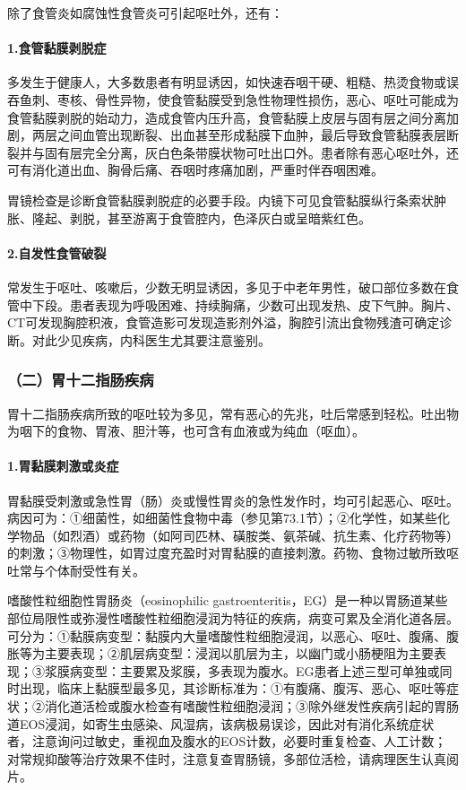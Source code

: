 除了食管炎如腐蚀性食管炎可引起呕吐外，还有：

\paragraph{1.食管黏膜剥脱症}

多发生于健康人，大多数患者有明显诱因，如快速吞咽干硬、粗糙、热烫食物或误吞鱼刺、枣核、骨性异物，使食管黏膜受到急性物理性损伤，恶心、呕吐可能成为食管黏膜剥脱的始动力，造成食管内压升高，食管黏膜上皮层与固有层之间分离加剧，两层之间血管出现断裂、出血甚至形成黏膜下血肿，最后导致食管黏膜表层断裂并与固有层完全分离，灰白色条带膜状物可吐出口外。患者除有恶心呕吐外，还可有消化道出血、胸骨后痛、吞咽时疼痛加剧，严重时伴吞咽困难。

胃镜检查是诊断食管黏膜剥脱症的必要手段。内镜下可见食管黏膜纵行条索状肿胀、隆起、剥脱，甚至游离于食管腔内，色泽灰白或呈暗紫红色。

\paragraph{2.自发性食管破裂}

常发生于呕吐、咳嗽后，少数无明显诱因，多见于中老年男性，破口部位多数在食管中下段。患者表现为呼吸困难、持续胸痛，少数可出现发热、皮下气肿。胸片、CT可发现胸腔积液，食管造影可发现造影剂外溢，胸腔引流出食物残渣可确定诊断。对此少见疾病，内科医生尤其要注意鉴别。

\subsubsection{（二）胃十二指肠疾病}

胃十二指肠疾病所致的呕吐较为多见，常有恶心的先兆，吐后常感到轻松。吐出物为咽下的食物、胃液、胆汁等，也可含有血液或为纯血（呕血）。

\paragraph{1.胃黏膜刺激或炎症}

胃黏膜受刺激或急性胃（肠）炎或慢性胃炎的急性发作时，均可引起恶心、呕吐。病因可为：①细菌性，如细菌性食物中毒（参见第73.1节）；②化学性，如某些化学物品（如烈酒）或药物（如阿司匹林、磺胺类、氨茶碱、抗生素、化疗药物等）的刺激；③物理性，如胃过度充盈时对胃黏膜的直接刺激。药物、食物过敏所致呕吐常与个体耐受性有关。

嗜酸性粒细胞性胃肠炎（eosinophilic
gastroenteritis，EG）是一种以胃肠道某些部位局限性或弥漫性嗜酸性粒细胞浸润为特征的疾病，病变可累及全消化道各层。可分为：①黏膜病变型：黏膜内大量嗜酸性粒细胞浸润，以恶心、呕吐、腹痛、腹胀等为主要表现；②肌层病变型：浸润以肌层为主，以幽门或小肠梗阻为主要表现；③浆膜病变型：主要累及浆膜，多表现为腹水。EG患者上述三型可单独或同时出现，临床上黏膜型最多见，其诊断标准为：①有腹痛、腹泻、恶心、呕吐等症状；②消化道活检或腹水检查有嗜酸性粒细胞浸润；③除外继发性疾病引起的胃肠道EOS浸润，如寄生虫感染、风湿病，该病极易误诊，因此对有消化系统症状者，注意询问过敏史，重视血及腹水的EOS计数，必要时重复检查、人工计数；对常规抑酸等治疗效果不佳时，注意复查胃肠镜，多部位活检，请病理医生认真阅片。

